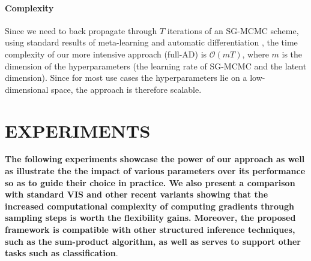 \paragraph{Complexity} Since we need to back propagate through $T$ iterations of an SG-MCMC scheme, using standard results of meta-learning and automatic differentiation \cite{franceschi2017forward}, the time complexity of our more intensive approach (full-AD) is $\mathcal{O}(mT)$, where $m$ is the dimension of the hyperparameters (the learning rate of SG-MCMC and the latent dimension). Since for most use cases the hyperparameters lie on a low-dimensional space, the approach is
therefore scalable.















\section{EXPERIMENTS}\label{sec:exps}


{\bf The following experiments showcase the power of our 
approach as well as illustrate the the impact of various parameters over its performance so as to guide their 
choice in practice. We 
also present a comparison with standard VIS
and other recent variants showing that the increased computational complexity of computing
gradients through sampling steps is worth the flexibility gains.
Moreover, the proposed framework is compatible with other structured inference techniques, such as the sum-product algorithm, as well as serves to support other tasks such as  classification}.

